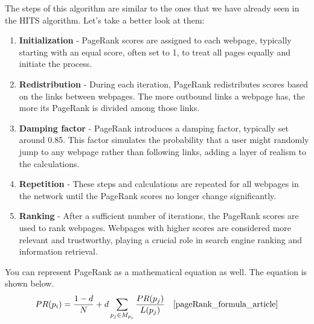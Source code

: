 \documentclass[10pt,english,a4paper]{article}
\begin{document}
The steps of this algorithm are similar to the ones that we have already seen in the HITS algorithm. Let's take a better look at them:
\begin{enumerate}
  \item \textbf{Initialization} - PageRank scores are assigned to each webpage, typically starting with an equal score, often set to 1, to treat all pages equally and initiate the process.
  \item \textbf{Redistribution} - During each iteration, PageRank redistributes scores based on the links between webpages. The more outbound links a webpage has, the more its PageRank is divided among those links.
  \item \textbf{Damping factor} - PageRank introduces a damping factor, typically set around 0.85. This factor simulates the probability that a user might randomly jump to any webpage rather than following links, adding a layer of realism to the calculations.
  \item \textbf{Repetition} - These steps and calculations are repeated for all webpages in the network until the PageRank scores no longer change significantly.
  \item \textbf{Ranking} -  After a sufficient number of iterations, the PageRank scores are used to rank webpages. Webpages with higher scores are considered more relevant and trustworthy, playing a crucial role in search engine ranking and information retrieval.
\end{enumerate}
You can represent PageRank as a mathematical equation as well. The equation is shown below. 
\[
PR(p_i) = \frac{1 - d}{N} + d \sum_{p_j \in M_{p_i}} \frac{PR(p_j)}{L(p_j)} \quad {\cite{pageRank_formula_article}}
\]
 

\end{document}
